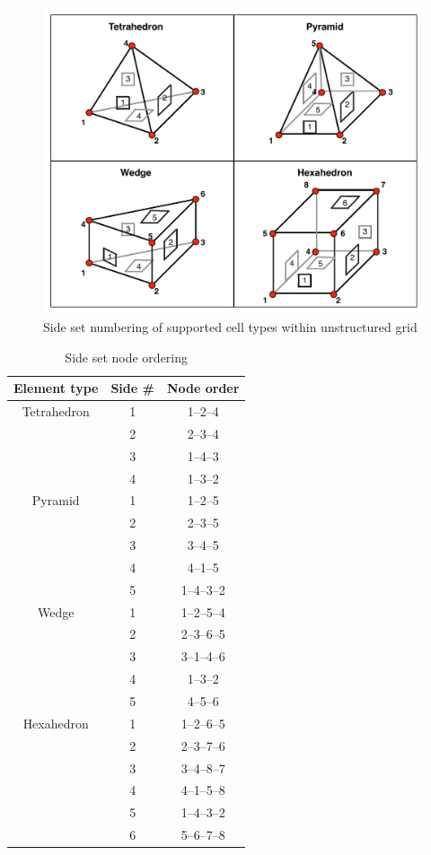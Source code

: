 \begin{figure}[H]\centering
\includegraphics[width=1\textwidth]{./figs/pflotran_umesh_cell_types}
\caption{Side set numbering of supported cell types within unstructured grid}
\label{fig:umesh_cell_types}
\end{figure}

\begin{table}[H]\centering
\caption{Side set node ordering}

\vspace{3mm}

\label{tab:sideset}
\begin{tabular}{ccc}
\toprule
Element type & Side \# & Node order\\
\midrule
Tetrahedron & 1 & 1--2--4 \\
 & 2 & 2--3--4 \\
 & 3 & 1--4--3 \\
 & 4 & 1--3--2\\
\midrule
Pyramid & 1 & 1--2--5 \\
 & 2 & 2--3--5 \\
 & 3 & 3--4--5 \\
 & 4 & 4--1--5 \\
 & 5 & 1--4--3--2 \\
\midrule
Wedge & 1  & 1--2--5--4\\
 & 2 & 2--3--6--5 \\
 & 3 & 3--1--4--6 \\
 & 4 & 1--3--2 \\
 & 5 & 4--5--6\\
\midrule
Hexahedron & 1 & 1--2--6--5 \\
 & 2 & 2--3--7--6 \\
 & 3 & 3--4--8--7 \\
 & 4 & 4--1--5--8 \\
 & 5 & 1--4--3--2 \\
 & 6 & 5--6--7--8 \\
\bottomrule
\end{tabular}
\end{table}



